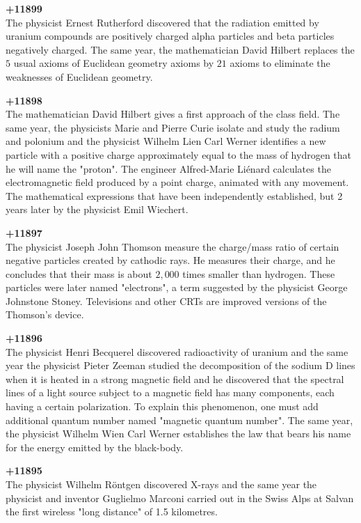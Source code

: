 \textbf{+11899}\\
The physicist Ernest Rutherford discovered that the radiation emitted by uranium compounds are positively charged alpha particles and beta particles negatively charged. The same year, the mathematician David Hilbert replaces the $5$ usual axioms of Euclidean geometry axioms by $21$ axioms to eliminate the weaknesses of Euclidean geometry. 

\textbf{+11898}\\
The mathematician David Hilbert gives a first approach of the class field. The same year, the physicists Marie and Pierre Curie isolate and study the radium and polonium and the physicist Wilhelm Lien Carl Werner identifies a new particle with a positive charge approximately equal to the mass of hydrogen that he will name the "proton". The engineer Alfred-Marie Liénard calculates the electromagnetic field produced by a point charge, animated with any movement. The mathematical expressions that have been independently established, but 2 years later by the physicist Emil Wiechert.

\textbf{+11897}\\
The physicist Joseph John Thomson measure the charge/mass ratio of certain negative particles created by cathodic rays. He measures their charge, and he concludes that their mass is about $2,000$ times smaller than hydrogen. These particles were later named "electrons", a term suggested by the physicist George Johnstone Stoney. Televisions and other CRTs are improved versions of the Thomson's device.

\textbf{+11896}\\
The physicist Henri Becquerel discovered radioactivity of uranium and the same year the physicist Pieter Zeeman studied the decomposition of the sodium D lines when it is heated in a strong magnetic field and he discovered that the spectral lines of a light source subject to a magnetic field has many components, each having a certain polarization. To explain this phenomenon, one must add additional quantum number named "magnetic quantum number". The same year, the physicist Wilhelm Wien Carl Werner establishes the law that bears his name for the energy emitted by the black-body.

\textbf{+11895}\\
The physicist Wilhelm Röntgen discovered X-rays and the same year the physicist and inventor Guglielmo Marconi carried out in the Swiss Alps at Salvan the first wireless "long distance" of 1.5 kilometres.

